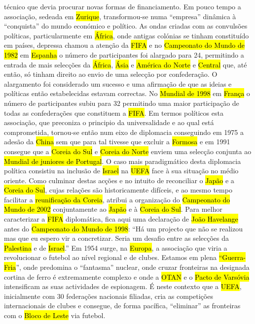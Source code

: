 \documentclass[a4paper,12pt]{article}
\begin{document}
 técnico que devia procurar novas formas de financiamento. Em pouco tempo a associação, sedeada em \hl{Zurique}, transformou-se numa “empresa” dinâmica à “conquista” do mundo económico e político.
 As ondas criadas com as convulsões políticas, particularmente em \hl{África}, onde antigas colónias se tinham constituído em países, depressa chamou a atenção da \hl{FIFA} e no \hl{Campeonato do Mundo de 1982} em \hl{Espanha} o número de participantes foi alargado para
24, permitindo a entrada de mais selecções da \hl{África}, \hl{Ásia} e \hl{América do Norte} e \hl{Central} que, até então, só tinham direito ao envio de uma selecção por confederação. O alargamento foi considerado um sucesso e uma afirmação de que as ideias e políticas então estabelecidas estavam correctas. No \hl{Mundial de 1998} em \hl{França} o número de participantes subiu para 32 permitindo uma maior participação de todas as confederações que constituem a \hl{FIFA}.
 Em termos políticos esta associação, que preconiza o principio da universalidade e ao qual está comprometida, tornou-se então num eixo de diplomacia conseguindo em 1975 a adesão da \hl{China} sem que para tal tivesse que excluir a \hl{Formosa} e em 1991 consegue que a \hl{Coreia do Sul} e \hl{Coreia do Norte} enviem uma selecção conjunta ao \hl{Mundial de juniores de Portugal}. O caso mais paradigmático desta diplomacia política consistiu na inclusão de \hl{Israel} na \hl{UEFA} face à sua situação no médio oriente. Como culminar destas acções e no intuito de reconciliar o \hl{Japão} e a \hl{Coreia do Sul}, cujas relações são historicamente difíceis, e ao mesmo tempo facilitar a \hl{reunificação da Coreia}, atribui a organização do \hl{Campeonato do Mundo de 2002} conjuntamente ao \hl{Japão} e à \hl{Coreia do Sul}.
 Para melhor caracterizar a \hl{FIFA} diplomática, fica aqui uma declaração de \hl{João Havelange} antes do \hl{Campeonato do Mundo de 1998}: “Há um projecto que não se realizou mas que eu espero vir a concretizar. Seria um desafio entre as selecções da \hl{Palestina} e de \hl{Israel}.”
 Em 1954 surge, na \hl{Europa}, a associação que viria a revolucionar o futebol ao nível regional e de clubes. Estamos em plena \hl{“Guerra-Fria}”, onde predomina o “fantasma” nuclear, onde cruzar fronteiras na designada cortina de ferro é extremamente complexo e onde a \hl{OTAN} e o \hl{Pacto de Varsóvia} intensificam as suas actividades de espionagem. É neste contexto que a \hl{UEFA}, inicialmente com 30 federações nacionais filiadas, cria as competições internacionais de clubes e consegue, de forma pacífica, “eliminar” as fronteiras com o \hl{Bloco de Leste} via futebol.
\end{document}
